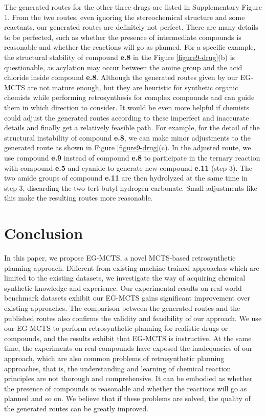 \documentclass[sn-mathphys,Numbered]{sn-jnl}
\begin{document}
The generated routes for the other three drugs are listed in Supplementary Figure 1. From the two routes, even ignoring the stereochemical structure and some reactants, our generated routes are definitely not perfect. There are many details to be perfected, such as whether the presence of intermediate compounds is reasonable and whether the reactions will go as planned. For a specific example, the structural stability of compound \textbf{e.8} in the Figure \ref{figure9-drug}(b) is questionable, as acylation may occur between the amine group and the acid chloride inside compound \textbf{e.8}. Although the generated routes given by our EG-MCTS are not mature enough, but they are heuristic for synthetic organic chemists while performing retrosynthesis for complex compounds and can guide them in which direction to consider. It would be even more helpful if chemists could adjust the generated routes according to these imperfect and inaccurate details and finally get a relatively feasible path. For example, for the detail of the structural instability of compound \textbf{e.8}, we can make minor adjustments to the generated route as shown in Figure \ref{figure9-drug}(c). In the adjusted route, we use compound \textbf{e.9} instead of compound \textbf{e.8} to participate in the ternary reaction with compound \textbf{e.5} and cyanide to generate new compound \textbf{e.11} (step 3). The two amide groups of compound \textbf{e.11} are then hydrolyzed at the same time in step 3, discarding the two tert-butyl hydrogen carbonate. Small adjustments like this make the resulting routes more reasonable.



\section{Conclusion}
In this paper, we propose EG-MCTS, a novel MCTS-based retrosynthetic planning approach. Different from existing machine-trained approaches which are limited to the existing datasets, we investigate the way of acquiring chemical synthetic knowledge and experience. Our experimental results on real-world benchmark datasets exhibit our EG-MCTS gains significant improvement over existing approaches. The comparison between the generated routes and the published routes also confirms the validity and feasibility of our approach. We use our EG-MCTS to perform retrosynthetic planning for realistic drugs or compounds, and the results exhibit that EG-MCTS is instructive. At the same time, the experiments on real compounds have exposed the inadequacies of our approach, which are also common problems of retrosynthetic planning approaches, that is, the understanding and learning of chemical reaction principles are not thorough and comprehensive. It can be embodied as whether the presence of compounds is reasonable and whether the reactions will go as planned and so on. We believe that if these problems are solved, the quality of the generated routes can be greatly improved.
\end{document}
